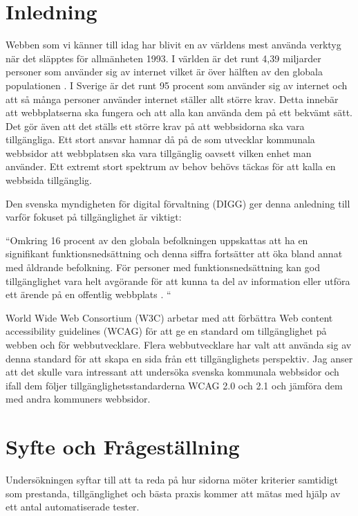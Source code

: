 \documentclass[11p]{article}
\begin{document}
    \setlength{\parindent}{0pt}
    \setlength{\parskip}{10pt}

    
    \section{Inledning}
    Webben som vi känner till idag har blivit en av världens mest använda verktyg när det släpptes för allmänheten 1993.
    I världen är det runt 4,39 miljarder personer som använder sig av internet vilket är över hälften av den globala populationen \textcite{history_WWW}.
    I Sverige är det runt 95 procent som använder sig av internet \textcite{SCB} och att så många personer använder internet ställer allt större krav.
    Detta innebär att webbplatserna ska fungera och att alla kan använda dem på ett bekvämt sätt.
    Det gör även att det ställs ett större krav på att webbsidorna ska vara tillgängliga.
    Ett stort ansvar hamnar då på de som utvecklar kommunala webbsidor att webbplatsen ska vara tillgänglig oavsett vilken enhet man använder.
    Ett extremt stort spektrum av behov behövs täckas för att kalla en webbsida tillgänglig.

    Den svenska myndigheten för digital förvaltning (DIGG) ger denna anledning till varför fokuset på tillgänglighet är viktigt:

    ``Omkring 16 procent av den globala befolkningen uppskattas att ha en signifikant funktionsnedsättning och denna siffra fortsätter att öka bland annat med åldrande befolkning.
    För personer med funktionsnedsättning kan god tillgänglighet vara helt avgörande för att kunna ta del av information eller utföra ett ärende på en offentlig webbplats \textcite{Digg_tillganglighet}.
    ``

    World Wide Web Consortium (W3C) arbetar med att förbättra Web content accessibility guidelines (WCAG) för att ge en standard om tillgänglighet på webben och för webbutvecklare.
    Flera webbutvecklare har valt att använda sig av denna standard för att skapa en sida från ett tillgänglighets perspektiv.
    Jag anser att det skulle vara intressant att undersöka svenska kommunala webbsidor och ifall dem följer tillgänglighetsstandarderna WCAG 2.0 och 2.1 och jämföra dem med andra kommuners webbsidor.
    
    \section{Syfte och Frågeställning}
    Undersökningen syftar till att ta reda på hur sidorna möter kriterier samtidigt som prestanda, tillgänglighet och bästa praxis kommer att mätas med hjälp av ett antal automatiserade tester.
\end{document}
